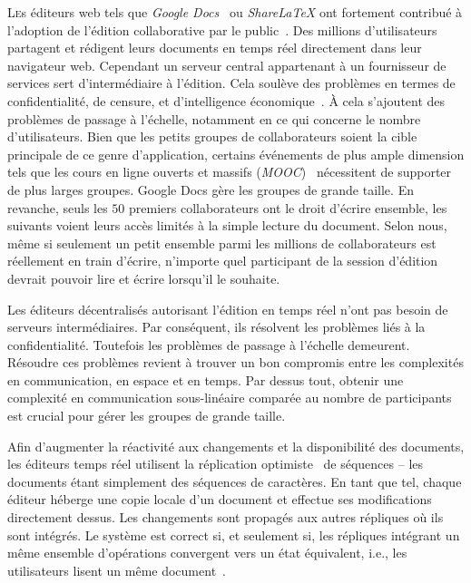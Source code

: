 
\lettrine{L}es éditeurs web tels que \emph{Google Docs}~\cite{googledocs} ou
\emph{ShareLaTeX}\cite{sharelatex} ont fortement contribué à l'adoption de
l'édition collaborative par le public~\cite{mogan2010impact}. Des millions
d'utilisateurs partagent et rédigent leurs documents en temps réel directement
dans leur navigateur web. Cependant un serveur central appartenant à un
fournisseur de services sert d'intermédiaire à l'édition. Cela soulève des
problèmes en termes de confidentialité, de censure, et d'intelligence
économique~\cite{cherrueau2016composer, gellman2013us, pearson2011toward}. À
cela s'ajoutent des problèmes de passage à l'échelle, notamment en ce qui
concerne le nombre d'utilisateurs. Bien que les petits groupes de collaborateurs
soient la cible principale de ce genre d'application, certains événements de
plus ample dimension tels que les cours en ligne ouverts et massifs
(\emph{MOOC})~\cite{breslow2013studying} nécessitent de supporter de plus larges
groupes. Google Docs gère les groupes de grande taille. En revanche, seuls les
$50$ premiers collaborateurs ont le droit d'écrire ensemble, les suivants voient
leurs accès limités à la simple lecture du document. Selon nous, même si
seulement un petit ensemble parmi les millions de collaborateurs est réellement
en train d'écrire, n'importe quel participant de la session d'édition devrait
pouvoir lire et écrire lorsqu'il le souhaite.

Les éditeurs décentralisés autorisant l'édition en temps réel n'ont pas besoin
de serveurs intermédiaires. Par conséquent, ils résolvent les problèmes liés à
la confidentialité. Toutefois les problèmes de passage à l'échelle
demeurent. Résoudre ces problèmes revient à trouver un bon compromis entre les
complexités en communication, en espace et en temps. Par dessus tout, obtenir
une complexité en communication sous-linéaire comparée au nombre de participants
est crucial pour gérer les groupes de grande taille.

Afin d'augmenter la réactivité aux changements et la disponibilité des
documents, les éditeurs temps réel utilisent la réplication
optimiste~\cite{demers1987epidemic, ladin1992providing, saito2005optimistic,
sun1998achieving} de séquences -- les documents étant simplement des séquences
de caractères. En tant que tel, chaque éditeur héberge une copie locale d'un
document et effectue ses modifications directement dessus. Les changements sont
propagés aux autres répliques où ils sont intégrés. Le système est correct si,
et seulement si, les répliques intégrant un même ensemble d'opérations
convergent vers un état équivalent, i.e., les utilisateurs lisent un même
document~\cite{bailis2013eventual, shapiro2011conflict}.

